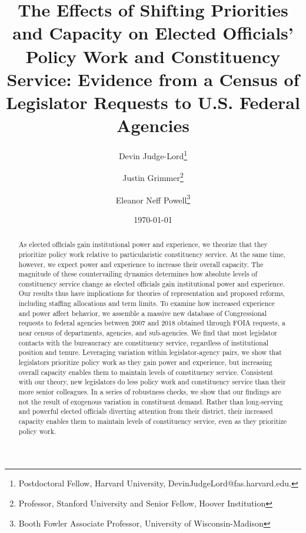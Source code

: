 \documentclass[12pt]{article}
\title{The Effects of Shifting Priorities and Capacity on Elected Officials' Policy Work and Constituency Service: Evidence from a Census of Legislator Requests to U.S. Federal Agencies}
\author{Devin Judge-Lord\thanks{Postdoctoral Fellow, Harvard University, DevinJudgeLord@fas.harvard.edu.}\and Justin Grimmer\thanks{Professor, Stanford University and Senior Fellow, Hoover Institution} \and Eleanor Neff Powell\thanks{Booth Fowler Associate Professor, University of Wisconsin-Madison}}
\date{\today}
\begin{document}
\maketitle




\begin{abstract}
\noindent 
As elected officials gain institutional power and experience, we theorize that they prioritize policy work relative to particularistic constituency service. At the same time, however, we expect power and experience to increase their overall capacity. The magnitude of these countervailing dynamics determines how absolute levels of constituency service change as elected officials gain institutional power and experience. 
Our results thus have implications for theories of representation and proposed reforms, including staffing allocations and term limits. 
To examine how increased experience and power affect behavior, we assemble a massive new database of   Congressional requests to federal agencies between 2007 and 2018 obtained through  FOIA requests, a near census of departments, agencies, and sub-agencies.
We find that most legislator contacts with the bureaucracy are constituency service, regardless of institutional position and tenure. 
Leveraging variation within legislator-agency pairs, we show that legislators prioritize policy work as they gain power and experience, but increasing overall capacity enables them to maintain levels of constituency service. Consistent with our theory, new legislators do less policy work and constituency service than their more senior colleagues. In a series of robustness checks, we show that our findings are not the result of exogenous variation in constituent demand.
Rather than long-serving and powerful elected officials diverting attention from their district,  their increased capacity enables them to maintain levels of constituency service, even as they prioritize policy work.


\end{abstract}
\end{document}
